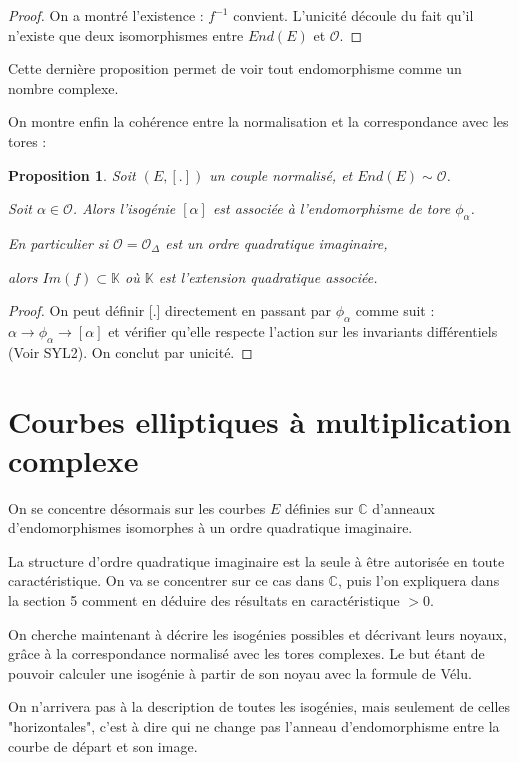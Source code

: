 \documentclass{article}
\newcommand{\C}[0]{\mathbb{C}}
\newcommand{\K}[0]{\mathbb{K}}
\newcommand{\OR}[0]{\mathcal{O}}
\newtheorem{Prop}[The]{Proposition}
\begin{document}
\begin{proof}
	On a montré l'existence : $f^{-1}$ convient. L'unicité découle du fait qu'il n'existe que deux isomorphismes entre $End(E)$ et $\OR$.
\end{proof}

Cette dernière proposition permet de voir tout endomorphisme comme un nombre complexe. 

On montre enfin la cohérence entre la normalisation et la correspondance avec les tores :

\begin{Prop}
	Soit $(E,[.])$ un couple normalisé, et $End(E)\sim\OR$. 
	
	Soit $\alpha\in\OR$. Alors l'isogénie $[\alpha]$ est associée à l'endomorphisme de tore $\phi_{\alpha}$.
	
	En particulier si $\OR = \OR_{\Delta}$ est un ordre quadratique imaginaire, 
	
	alors $Im(f)\subset\K$ où $\K$ est l'extension quadratique associée.
	
\end{Prop}

\begin{proof}
	On peut définir [.] directement en passant par $\phi_{\alpha}$ comme suit : $\alpha\rightarrow\phi_{\alpha}\rightarrow [\alpha]$ et vérifier qu'elle respecte l'action sur les invariants différentiels (Voir SYL2). On conclut par unicité. 
\end{proof}




\section{Courbes elliptiques à multiplication complexe}

On se concentre désormais sur les courbes $E$ définies sur $\C$ d'anneaux d'endomorphismes isomorphes à un ordre quadratique imaginaire. 

La structure d'ordre quadratique imaginaire est la seule à être autorisée en toute caractéristique. On va se concentrer sur ce cas dans $\C$, puis l'on expliquera dans la section 5 comment en déduire des résultats en caractéristique $>0$.

On cherche maintenant à décrire les isogénies possibles et décrivant leurs noyaux, grâce à la correspondance normalisé avec les tores complexes. Le but étant de pouvoir calculer une isogénie à partir de son noyau avec la formule de Vélu. 

On n'arrivera pas à la description de toutes les isogénies, mais seulement de celles "horizontales", c'est à dire qui ne change pas l’anneau d'endomorphisme entre la courbe de départ et son image. 
\end{document}
